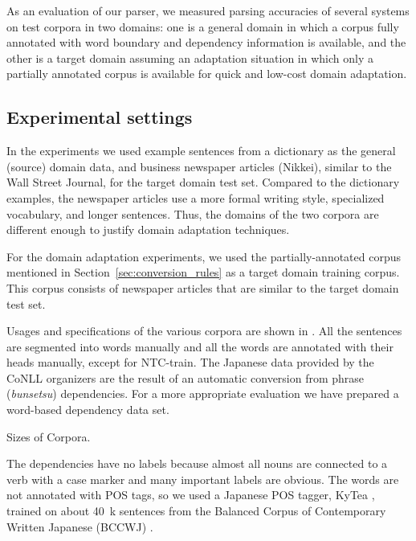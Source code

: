 \documentclass[english]{jnlp_1.4}
\def\tabref#1{}
\begin{document}
As an evaluation of our parser, 
we measured parsing accuracies of several systems on test corpora in
two domains: 
\pagebreak
one is a general domain in which a corpus fully annotated with word
boundary and dependency information is available, and the other is a target domain assuming an
adaptation situation in which only a partially annotated corpus is available for quick and low-cost
domain adaptation.



\subsection{Experimental settings}
\label{sec:experimental-settings}

In the experiments we used example sentences from a dictionary
\cite{Japanese-English.Sentence.Equivalents} as the general (source) domain data, and business
newspaper articles (Nikkei), similar to the Wall Street Journal, for the target domain test
set. Compared to the dictionary examples, the newspaper articles use a more formal writing style,
specialized vocabulary, and longer sentences. Thus, the domains of the two corpora are
different enough to justify domain adaptation techniques.

For the domain adaptation experiments, we used the partially-annotated corpus mentioned in
Section~\ref{sec:conversion_rules} as a target domain training corpus. This corpus consists of
newspaper articles that are similar to the target domain test set.

Usages and specifications of the various corpora are shown in \tabref{table:corpus}. All the
sentences are segmented into words manually and all the words are annotated with their heads
manually, except for NTC-train. The Japanese data provided by the CoNLL organizers
\cite{buchholz2006} are the result of an automatic conversion from phrase ({\it bunsetsu})
dependencies. For a more appropriate evaluation we have prepared a word-based dependency data set.

\begin{table}[b]
\caption{Sizes of Corpora.}
  \label{table:corpus}

\end{table}

The dependencies have no labels because almost all nouns are connected to a verb with a case marker
and many important labels are obvious. The words are not annotated with POS tags,
so we used a Japanese POS tagger, KyTea \cite{neubig11aclshort}, trained on about 40~k sentences from
the Balanced Corpus of Contemporary Written Japanese (BCCWJ) \cite{maekawa08bccwj}.
\end{document}
